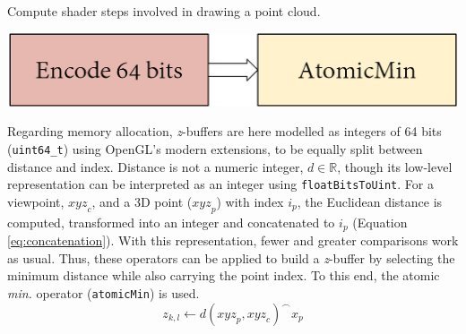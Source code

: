\begin{marginfigure}[.cm]
    \caption{Compute shader steps involved in drawing a point cloud.}
    \label{fig:occlusion_compute_shader_zbuffer_core}
    \includegraphics[width=\linewidth]{figs/multi_thermal_projection/occlusion_compute_shader_core.png}
\end{marginfigure}
Regarding memory allocation, \textit{z}-buffers are here modelled as integers of 64 bits (\verb|uint64_t|) using OpenGL's modern extensions, to be equally split between distance and index. Distance is not a numeric integer, $d \in \mathbb{R}$, though its low-level representation can be interpreted as an integer using \verb|floatBitsToUint|. For a viewpoint, $\textit{xyz}_c$, and a 3D point ($\textit{xyz}_p$) with index $i_p$, the Euclidean distance is computed, transformed into an integer and concatenated to $i_p$ (Equation \ref{eq:concatenation}). With this representation, fewer and greater comparisons work as usual. Thus, these operators can be applied to build a \textit{z}-buffer by selecting the minimum distance while also carrying the point index. To this end, the atomic \textit{min.} operator (\verb|atomicMin|) is used.
\begin{equation}
\label{eq:concatenation}
z_{k, l} \gets d(\textit{xyz}_p, \textit{xyz}_c) ^\frown x_p
\end{equation}

